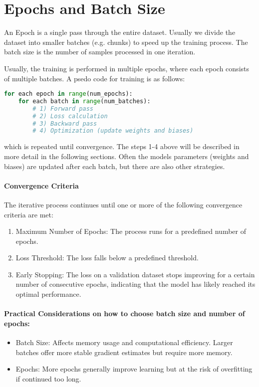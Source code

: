 \documentclass{article}
\begin{document}
\section{Epochs and Batch Size}
An Epoch is a single pass through the entire dataset. Usually we divide the dataset into smaller batches (e.g. chunks) to speed up the training process. The batch size is the number of samples processed in one iteration. 

Usually, the training is performed in multiple epochs, where each epoch consists of multiple batches. A psedo code for training is as follows:

\begin{lstlisting}[language=Python]
for each epoch in range(num_epochs):
    for each batch in range(num_batches):
        # 1) Forward pass
        # 2) Loss calculation
        # 3) Backward pass
        # 4) Optimization (update weights and biases)
\end{lstlisting}
which is repeated until convergence. The steps 1-4 above will be described in more detail in the following sections. Often the models parameters (weights and biases) are updated after each batch, but there are also other strategies. 

\paragraph{Convergence Criteria}
The iterative process continues until one or more of the following convergence criteria are met:

\begin{enumerate}
    \item Maximum Number of Epochs: The process runs for a predefined number of epochs.
    \item Loss Threshold: The loss falls below a predefined threshold.
    \item Early Stopping: The loss on a validation dataset stops improving for a certain number of consecutive epochs, indicating that the model has likely reached its optimal performance.
\end{enumerate}

\paragraph{Practical Considerations on how to choose batch size and number of epochs:}
\begin{itemize}
    \item Batch Size: Affects memory usage and computational efficiency. Larger batches offer more stable gradient estimates but require more memory.
    \item Epochs: More epochs generally improve learning but at the risk of overfitting if continued too long.
\end{itemize}
    
\end{document}
